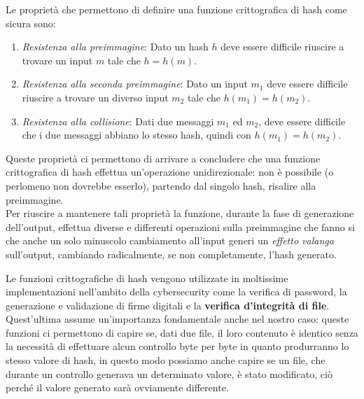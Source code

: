 Le proprietà che permettono di definire una funzione crittografica di hash come sicura sono:
\begin{enumerate}
    \item \emph{Resistenza alla preimmagine}: Dato un hash \(h\) deve essere difficile riuscire a
    trovare un input \(m\) tale che \(h = h(m)\).
    \item \emph{Resistenza alla seconda preimmagine}: Dato un input \(m_1\) deve essere difficile
    riuscire a trovare un diverso input \(m_2\) tale che \(h(m_1) = h(m_2)\).
    \item \emph{Resistenza alla collisione}: Dati due messaggi \(m_1\) ed \(m_2\), deve essere
    difficile che i due messaggi abbiano lo stesso hash, quindi con \(h(m_1) = h(m_2)\).
\end{enumerate}
Queste proprietà ci permettono di arrivare a concludere che una funzione crittografica di
hash effettua un’operazione unidirezionale: non è possibile (o perlomeno non dovrebbe esserlo),
partendo dal singolo hash, risalire alla preimmagine. \\
Per riuscire a mantenere tali proprietà la funzione, durante la fase di generazione
dell’output, effettua diverse e differenti operazioni sulla preimmagine
che fanno si che anche un solo minuscolo cambiamento all’input generi
un \emph{effetto valanga} sull’output, cambiando radicalmente, se non completamente,
l’hash generato.

Le funzioni crittografiche di hash vengono utilizzate in moltissime implementazioni
nell’ambito della cybersecurity come la verifica di password, la generazione e
validazione di firme digitali e la \textbf{verifica d’integrità di file}.
Quest’ultima assume un’importanza fondamentale anche nel nostro caso: queste funzioni
ci permettono di capire se, dati due file, il loro contenuto è identico senza
la necessità di effettuare alcun controllo byte per byte in quanto produrranno
lo stesso valore di hash, in questo modo possiamo anche capire se un file,
che durante un controllo generava un determinato valore, è stato modificato,
ciò perché il valore generato sarà ovviamente differente.



